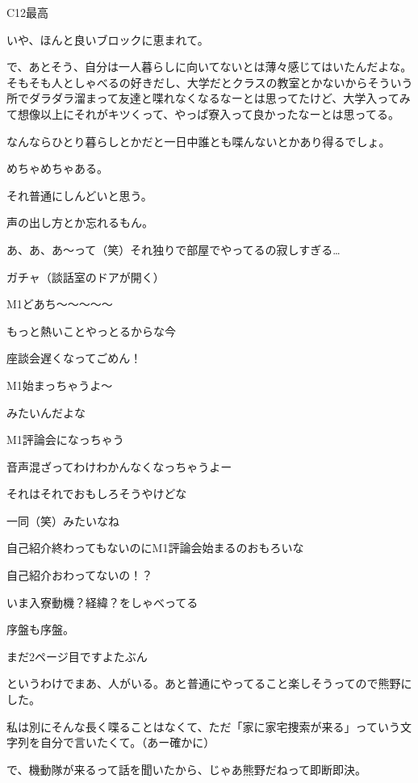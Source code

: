 \begin{multicols}{2}
  C12最高

  いや、ほんと良いブロックに恵まれて。

  で、あとそう、自分は一人暮らしに向いてないとは薄々感じてはいたんだよな。そもそも人としゃべるの好きだし、大学だとクラスの教室とかないからそういう所でダラダラ溜まって友達と喋れなくなるなーとは思ってたけど、大学入ってみて想像以上にそれがキツくって、やっぱ寮入って良かったなーとは思ってる。　

  なんならひとり暮らしとかだと一日中誰とも喋んないとかあり得るでしょ。

  めちゃめちゃある。

  それ普通にしんどいと思う。

  声の出し方とか忘れるもん。

  あ、あ、あ～って（笑）それ独りで部屋でやってるの寂しすぎる…

  ガチャ（談話室のドアが開く）

  M1どあち～～～～～

  もっと熱いことやっとるからな今

  座談会遅くなってごめん！

  M1始まっちゃうよ～

  みたいんだよな

  M1評論会になっちゃう

  音声混ざってわけわかんなくなっちゃうよー

  それはそれでおもしろそうやけどな

  一同（笑）みたいなね

  自己紹介終わってもないのにM1評論会始まるのおもろいな

  自己紹介おわってないの！？

  いま入寮動機？経緯？をしゃべってる

  序盤も序盤。

  まだ2ページ目ですよたぶん

  というわけでまあ、人がいる。あと普通にやってること楽しそうってので熊野にした。

  私は別にそんな長く喋ることはなくて、ただ「家に家宅捜索が来る」っていう文字列を自分で言いたくて。（あー確かに）

  で、機動隊が来るって話を聞いたから、じゃあ熊野だねって即断即決。


\end{multicols}
